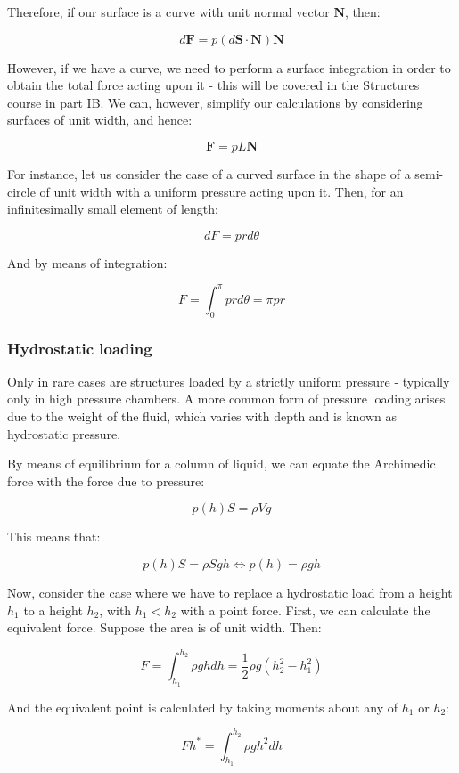 \documentclass{article}
\begin{document}
Therefore, if our surface is a curve with unit normal vector $\mathbf{N}$, then:

\[ d\mathbf{F} = p (d\mathbf{S} \cdot \mathbf{N}) \mathbf{N} \]

However, if we have a curve, we need to perform a surface integration in order to obtain the total force acting upon it - this will be covered in the Structures course in part IB. We can, however, simplify our calculations by considering surfaces of unit width, and hence:

\[ \mathbf{F} = pL\mathbf{N} \]

\begin{example}
    For instance, let us consider the case of a curved surface in the shape of a semi-circle of unit width with a uniform pressure acting upon it. Then, for an infinitesimally small element of length:

    \[ dF = prd\theta \]

    And by means of integration:

    \[ F = \int_0^\pi prd\theta = \pi pr \]
\end{example}

\subsubsection{Hydrostatic loading}

Only in rare cases are structures loaded by a strictly uniform pressure - typically only in high pressure chambers. A more common form of pressure loading arises due to the weight of the fluid, which varies with depth and is known as hydrostatic pressure.

By means of equilibrium for a column of liquid, we can equate the Archimedic force with the force due to pressure:

\[ p(h)S = \rho Vg \]

This means that:

\[ p(h)S = \rho Sgh \iff p(h) = \rho gh \]

Now, consider the case where we have to replace a hydrostatic load from a height $h_1$ to a height $h_2$, with $h_1 < h_2$ with a point force. First, we can calculate the equivalent force. Suppose the area is of unit width. Then:

\[ F = \int_{h_1}^{h_2} \rho ghdh = \frac{1}{2}\rho g(h_2^2 - h_1^2) \]

And the equivalent point is calculated by taking moments about any of $h_1$ or $h_2$:

\[ Fh^* = \int_{h_1}^{h_2}\rho g h^2 dh \]
\end{document}
